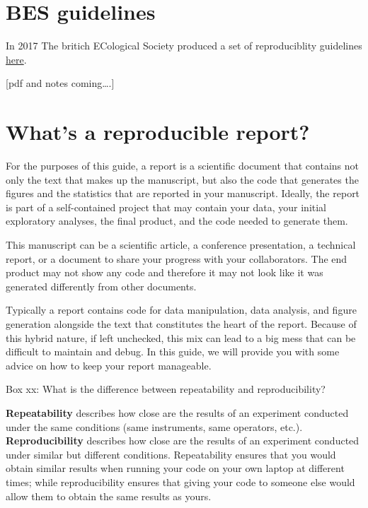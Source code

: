 \documentclass[
]{book}
\theoremstyle{definition}
\theoremstyle{definition}
\theoremstyle{definition}
\theoremstyle{definition}
\theoremstyle{remark}
\begin{document}
\hypertarget{bes-guidelines}{%
\section{BES guidelines}\label{bes-guidelines}}

In 2017 The britich ECological Society produced a set of reproduciblity guidelines \href{https://github.com/BES2016Workshop/guidebook}{here}.

{[}pdf and notes coming\ldots.{]}

\hypertarget{whats-a-reproducible-report}{%
\section{What's a reproducible report?}\label{whats-a-reproducible-report}}

For the purposes of this guide, a report is a scientific document that contains not only the text that makes up the manuscript, but also the code that generates the figures and the statistics that are reported in your manuscript. Ideally, the report is part of a self-contained project that may contain your data, your initial exploratory analyses, the final product, and the code needed to generate them.

This manuscript can be a scientific article, a conference presentation, a technical report, or a document to share your progress with your collaborators. The end product may not show any code and therefore it may not look like it was generated differently from other documents.

Typically a report contains code for data manipulation, data analysis, and figure generation alongside the text that constitutes the heart of the report. Because of this hybrid nature, if left unchecked, this mix can lead to a big mess that can be difficult to maintain and debug. In this guide, we will provide you with some advice on how to keep your report manageable.

Box xx: What is the difference between repeatability and reproducibility?

\textbf{Repeatability} describes how close are the results of an experiment conducted under the same conditions (same instruments, same operators, etc.). \textbf{Reproducibility} describes how close are the results of an experiment conducted under similar but different conditions. Repeatability ensures that you would obtain similar results when running your code on your own laptop at different times; while reproducibility ensures that giving your code to someone else would allow them to obtain the same results as yours.
\end{document}

